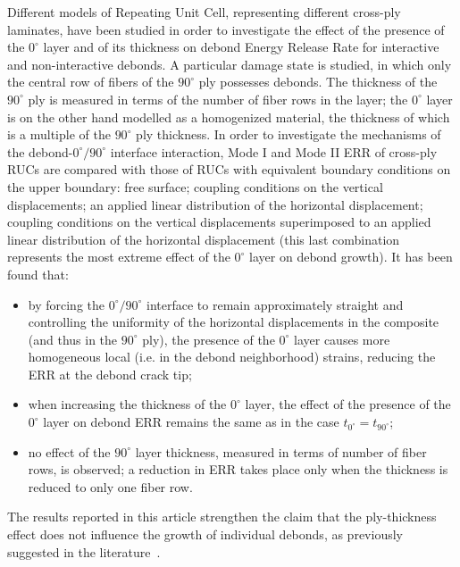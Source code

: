 \documentclass[Review,sagev,times]{sagej}
\begin{document}
Different models of Repeating Unit Cell, representing different cross-ply laminates, have been studied in order to investigate the effect of the presence of the $0^{\circ}$ layer and of its thickness on debond Energy Release Rate for interactive and non-interactive debonds. A particular damage state is studied, in which only the central row of fibers of the $90^{\circ}$ ply possesses debonds. The thickness of the $90^{\circ}$ ply is measured in terms of the number of fiber rows in the layer; the $0^{\circ}$ layer is on the other hand modelled as a homogenized material, the thickness of which is a multiple of the $90^{\circ}$ ply thickness. In order to investigate the mechanisms of the debond-$0^{\circ}/90^{\circ}$ interface interaction, Mode I and Mode II ERR of cross-ply RUCs are compared with those of RUCs with equivalent boundary conditions on the upper boundary: free surface; coupling conditions on the vertical displacements; an applied linear distribution of the horizontal displacement; coupling conditions on the vertical displacements superimposed to an applied linear distribution of the horizontal displacement (this last combination represents the most extreme effect of the $0^{\circ}$ layer on debond growth). It has been found that:
\begin{itemize}
\item by forcing the $0^{\circ}/90^{\circ}$ interface to remain approximately straight and controlling the uniformity of the horizontal displacements in the composite (and thus in the $90^{\circ}$ ply), the presence of the $0^{\circ}$ layer causes more homogeneous local (i.e. in the debond neighborhood) strains, reducing the ERR at the debond crack tip;
\item when increasing the thickness of the $0^{\circ}$ layer, the effect of the presence of the $0^{\circ}$ layer on debond ERR remains the same as in the case $t_{0^{\circ}}=t_{90^{\circ}}$;
\item no effect of the $90^{\circ}$ layer thickness, measured in terms of number of fiber rows, is observed; a reduction in ERR takes place only when the thickness is reduced to only one fiber row.
\end{itemize}
The results reported in this article strengthen the claim that the ply-thickness effect does not influence the growth of individual debonds, as previously suggested in the literature~\cite{Saito2012,Herraez2015,Velasco2018, Paris2018}. 
\end{document}
